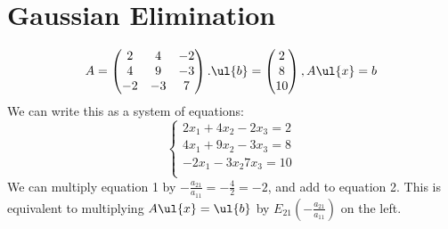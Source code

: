 \chapter{Gaussian Elimination}
\begin{example}
\[
A = \begin{pmatrix}
2 & 4 & -2 \\
4 & 9 & -3\\
-2 & -3 & 7
\end{pmatrix}. \ul{b}=\begin{pmatrix}
2\\
8\\
10
\end{pmatrix}, A\ul{x}= b
\]	
We can write this as a system of equations:
\[
\begin{cases}
2x_1 + 4x_2-2x_3 = 2\\
4x_1 +9x_2 -3x_3 = 8\\
-2x_1 -3x_2 7x_3 = 10\\	
\end{cases}
\]
We can multiply equation 1 by $-\frac{a_{21}}{a_{11}}= -\frac{4}{2} = -2$, and add to equation 2. This is equivalent to multiplying $A\ul{x} = \ul{b}$ by $E_{21}\left( -\frac{a_{21}}{a_{11}}\right)$ on the left. 


\end{example}
